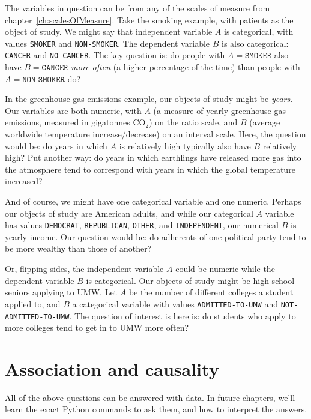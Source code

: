 
The variables in question can be from any of the scales of measure from
chapter~\ref{ch:scalesOfMeasure}. Take the smoking example, with patients as
the object of study. We might say that independent variable $A$ is categorical,
with values \texttt{SMOKER} and \texttt{NON-SMOKER}. The dependent variable $B$
is also categorical: \texttt{CANCER} and \texttt{NO-CANCER}. The key question
is: do people with $A=\texttt{SMOKER}$ also have $B=\texttt{CANCER}$
\textit{more often} (a higher percentage of the time) than people with
$A=\texttt{NON-SMOKER}$ do?


In the greenhouse gas emissions example, our objects of study might be
\textit{years}. Our variables are both numeric, with $A$ (a measure of yearly
greenhouse gas emissions, measured in gigatonnes $\textrm{CO}_2$) on the ratio
scale, and $B$ (average worldwide temperature increase/decrease) on an interval
scale. Here, the question would be: do years in which $A$ is relatively high
typically also have $B$ relatively high? Put another way: do years in which
earthlings have released more gas into the atmosphere tend to correspond with
years in which the global temperature increased?

And of course, we might have one categorical variable and one numeric. Perhaps
our objects of study are American adults, and while our categorical $A$
variable has values \texttt{DEMOCRAT}, \texttt{REPUBLICAN}, \texttt{OTHER}, and
\texttt{INDEPENDENT}, our numerical $B$ is yearly income. Our question would
be: do adherents of one political party tend to be more wealthy than those of
another?

Or, flipping sides, the independent variable $A$ could be numeric while the
dependent variable $B$ is categorical. Our objects of study might be high
school seniors applying to UMW. Let $A$ be the number of different colleges a
student applied to, and $B$ a categorical variable with values
\texttt{ADMITTED-TO-UMW} and \texttt{NOT-ADMITTED-TO-UMW}. The question of
interest is here is: do students who apply to more colleges tend to get in to
UMW more often?

\section{Association and causality}

All of the above questions can be answered with data. In future chapters, we'll
learn the exact Python commands to ask them, and how to interpret the answers.

